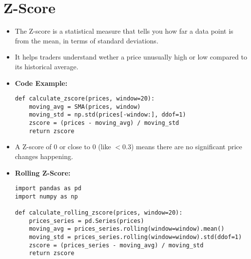 \documentclass{article}
\begin{document}
\section*{Z-Score}
\begin{itemize}
    \item The Z-score is a statistical measure that tells you how far a data point is from the mean, in terms of standard deviations.
    \item It helps traders understand wether a price unusually high or low compared to its historical average.
    \item \textbf{Code Example:}
    \begin{lstlisting}
def calculate_zscore(prices, window=20):
    moving_avg = SMA(prices, window)
    moving_std = np.std(prices[-window:], ddof=1)
    zscore = (prices - moving_avg) / moving_std
    return zscore
    \end{lstlisting}
    \item A Z-score of 0 or close to 0 (like $<0.3$) means there are no significant price changes happening.
    \newpage
    \item \textbf{Rolling Z-Score: }
    \begin{lstlisting}
import pandas as pd
import numpy as np

def calculate_rolling_zscore(prices, window=20):
    prices_series = pd.Series(prices)
    moving_avg = prices_series.rolling(window=window).mean()
    moving_std = prices_series.rolling(window=window).std(ddof=1)
    zscore = (prices_series - moving_avg) / moving_std
    return zscore
    \end{lstlisting}
\end{itemize}
\end{document}
